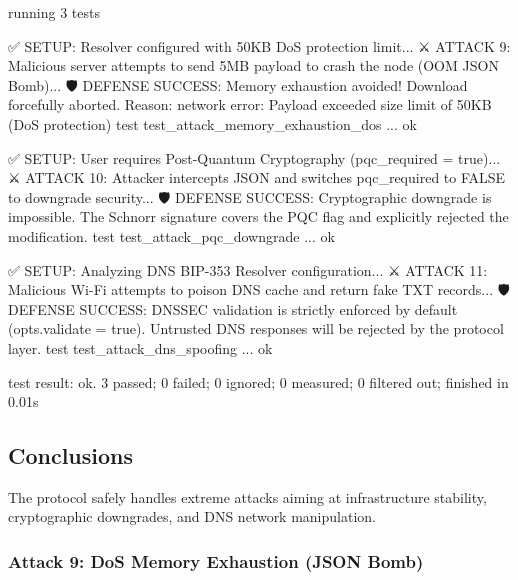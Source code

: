 \documentclass[
]{article}
\newenvironment{Shaded}{}{}
\newcommand{\NormalTok}[1]{#1}
\begin{document}
\begin{Shaded}
\begin{Highlighting}[]
\NormalTok{running 3 tests}

\NormalTok{✅ SETUP: Resolver configured with 50KB DoS protection limit...}
\NormalTok{⚔️ ATTACK 9: Malicious server attempts to send 5MB payload to crash the node (OOM JSON Bomb)...}
\NormalTok{🛡️ DEFENSE SUCCESS: Memory exhaustion avoided! Download forcefully aborted. Reason: network error: Payload exceeded size limit of 50KB (DoS protection)}
\NormalTok{test test\_attack\_memory\_exhaustion\_dos ... ok}

\NormalTok{✅ SETUP: User requires Post{-}Quantum Cryptography (pqc\_required = true)...}
\NormalTok{⚔️ ATTACK 10: Attacker intercepts JSON and switches pqc\_required to FALSE to downgrade security...}
\NormalTok{🛡️ DEFENSE SUCCESS: Cryptographic downgrade is impossible. The Schnorr signature covers the PQC flag and explicitly rejected the modification.}
\NormalTok{test test\_attack\_pqc\_downgrade ... ok}

\NormalTok{✅ SETUP: Analyzing DNS BIP{-}353 Resolver configuration...}
\NormalTok{⚔️ ATTACK 11: Malicious Wi{-}Fi attempts to poison DNS cache and return fake TXT records...}
\NormalTok{🛡️ DEFENSE SUCCESS: DNSSEC validation is strictly enforced by default (\textasciigrave{}opts.validate = true\textasciigrave{}). Untrusted DNS responses will be rejected by the protocol layer.}
\NormalTok{test test\_attack\_dns\_spoofing ... ok}

\NormalTok{test result: ok. 3 passed; 0 failed; 0 ignored; 0 measured; 0 filtered out; finished in 0.01s}
\end{Highlighting}
\end{Shaded}

\hypertarget{conclusions-4}{%
\subsection{Conclusions}\label{conclusions-4}}

The protocol safely handles extreme attacks aiming at infrastructure
stability, cryptographic downgrades, and DNS network manipulation.

\hypertarget{attack-9-dos-memory-exhaustion-json-bomb}{%
\subsubsection{Attack 9: DoS Memory Exhaustion (JSON
Bomb)}\label{attack-9-dos-memory-exhaustion-json-bomb}}
\end{document}
